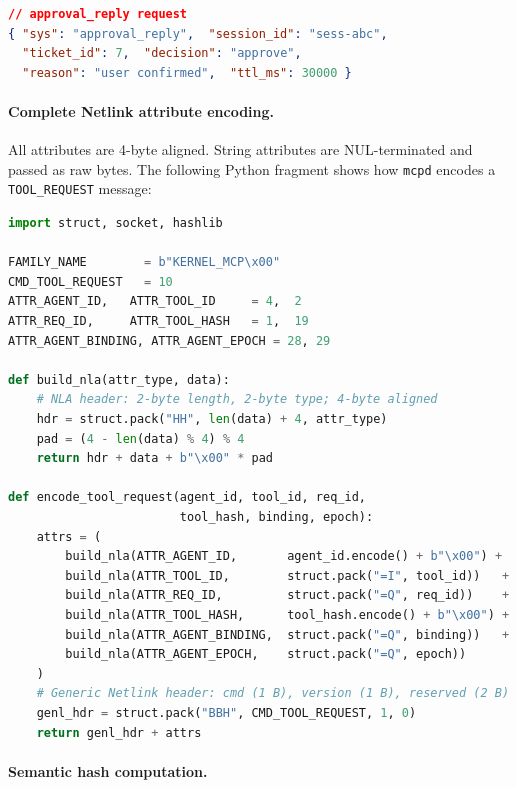 \begin{lstlisting}[style=codestyle, language=json, caption={approval\_reply message (llm-app $\to$ mcpd, issued after user confirms a deferred operation).}]
// approval_reply request
{ "sys": "approval_reply",  "session_id": "sess-abc",
  "ticket_id": 7,  "decision": "approve",
  "reason": "user confirmed",  "ttl_ms": 30000 }
\end{lstlisting}

\paragraph{Complete Netlink attribute encoding.}

All attributes are 4-byte aligned.
String attributes are NUL-terminated and passed as raw bytes.
The following Python fragment shows how \texttt{mcpd} encodes a \texttt{TOOL\_REQUEST} message:

\begin{lstlisting}[style=codestyle, language=Python, caption={Python fragment: encoding a \texttt{TOOL\_REQUEST} Generic Netlink message (mcpd $\to$ kernel).}]
import struct, socket, hashlib

FAMILY_NAME        = b"KERNEL_MCP\x00"
CMD_TOOL_REQUEST   = 10
ATTR_AGENT_ID,   ATTR_TOOL_ID     = 4,  2
ATTR_REQ_ID,     ATTR_TOOL_HASH   = 1,  19
ATTR_AGENT_BINDING, ATTR_AGENT_EPOCH = 28, 29

def build_nla(attr_type, data):
    # NLA header: 2-byte length, 2-byte type; 4-byte aligned
    hdr = struct.pack("HH", len(data) + 4, attr_type)
    pad = (4 - len(data) % 4) % 4
    return hdr + data + b"\x00" * pad

def encode_tool_request(agent_id, tool_id, req_id,
                        tool_hash, binding, epoch):
    attrs = (
        build_nla(ATTR_AGENT_ID,       agent_id.encode() + b"\x00") +
        build_nla(ATTR_TOOL_ID,        struct.pack("=I", tool_id))   +
        build_nla(ATTR_REQ_ID,         struct.pack("=Q", req_id))    +
        build_nla(ATTR_TOOL_HASH,      tool_hash.encode() + b"\x00") +
        build_nla(ATTR_AGENT_BINDING,  struct.pack("=Q", binding))   +
        build_nla(ATTR_AGENT_EPOCH,    struct.pack("=Q", epoch))
    )
    # Generic Netlink header: cmd (1 B), version (1 B), reserved (2 B)
    genl_hdr = struct.pack("BBH", CMD_TOOL_REQUEST, 1, 0)
    return genl_hdr + attrs
\end{lstlisting}

\paragraph{Semantic hash computation.}

